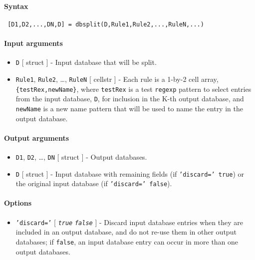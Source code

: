 


	\paragraph{Syntax}
 
 \begin{verbatim}
 [D1,D2,...,DN,D] = dbsplit(D,Rule1,Rule2,...,RuleN,...)
 \end{verbatim}
 
 \paragraph{Input arguments}
 
 \begin{itemize}
 \item
   \texttt{D} {[} struct {]} - Input database that will be split.
 \item
   \texttt{Rule1}, \texttt{Rule2}, \ldots{}, \texttt{RuleN} {[} cellstr
   {]} - Each rule is a 1-by-2 cell array, \texttt{\{testRex,newName\}},
   where \texttt{testRex} is a test \texttt{regexp} pattern to select
   entries from the input database, \texttt{D}, for inclusion in the K-th
   output database, and \texttt{newName} is a new name pattern that will
   be used to name the entry in the output database.
 \end{itemize}
 
 \paragraph{Output arguments}
 
 \begin{itemize}
 \item
   \texttt{D1}, \texttt{D2}, \ldots{}, \texttt{DN} {[} struct {]} -
   Output databases.
 \item
   \texttt{D} {[} struct {]} - Input database with remaining fields (if
   \texttt{'discard=' true}) or the original input database (if
   \texttt{'discard=' false}).
 \end{itemize}
 
 \paragraph{Options}
 
 \begin{itemize}
 \item
   \texttt{'discard='} {[} \emph{\texttt{true}} \textbar{}
   \emph{\texttt{false}} {]} - Discard input database entries when they
   are included in an output database, and do not re-use them in other
   output databases; if \texttt{false}, an input database entry can occur
   in more than one output databases.
 \end{itemize}
 
